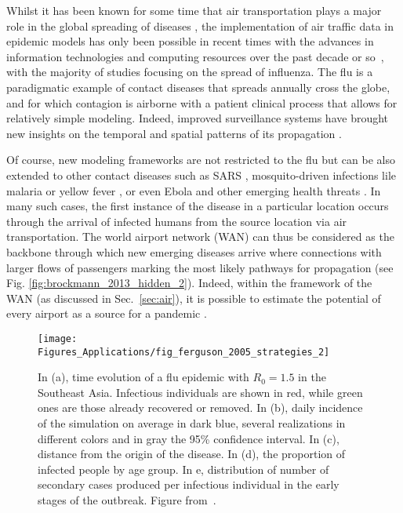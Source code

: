 Whilst it has been known for some time that air transportation plays a major role in the global spreading of diseases \cite{rvachev_1985_mathematical,flahault_1992_method}, the implementation of air traffic data in epidemic models has only been possible in recent times with the advances in information technologies and computing resources over the past decade or so~\cite{hufnagel_2004_forecast,grais_2003_assessing,colizza_2006_role},
%
with the majority of studies focusing on the spread of influenza. The flu is a paradigmatic example of contact diseases that spreads annually cross the globe, and for which contagion is airborne with a patient clinical process that allows for relatively simple modeling. Indeed, improved surveillance systems have brought new insights on the temporal and spatial patterns of its propagation \cite{viboud_2006_synchrony,tizzoni_2012_real}. 

Of course, new modeling frameworks are not restricted to the flu but can be also extended to other contact diseases such as SARS \cite{bauch_2005_dynamically}, mosquito-driven infections lile malaria \cite{huang_2013_global} or yellow fever \cite{johansson_2012_crowd}, or even Ebola and other emerging health threats \cite{jones_2008_global,gomes_2014_assessing}. In many such cases, the first instance of the disease in a particular location occurs through the arrival of infected humans from the source location via air transportation. The world airport network (WAN) can thus be considered as the backbone through which new emerging diseases arrive where connections with larger flows of passengers marking the most likely pathways for propagation \cite{brockmann_2013_hidden} (see Fig. \ref{fig:brockmann_2013_hidden_2}). Indeed, within the framework of the WAN (as discussed in Sec.~\ref{sec:air}), it is possible to estimate the potential of every airport as a source for a pandemic \cite{lawyer_2016_measuring}. 

\begin{figure}[t!]
\centering
\texttt{[image: Figures\_Applications/fig\_ferguson\_2005\_strategies\_2]}
\caption{In (a), time evolution of a flu epidemic with $R_0 = 1.5$ in the Southeast Asia. Infectious individuals are shown in red, while green ones are those already recovered or removed. In (b), daily incidence of the simulation on average in dark blue, several realizations in different colors and in gray the 95\% confidence interval. In (c), distance from the origin of the disease. In (d), the proportion of infected people by age group. In e, distribution of number of secondary cases produced per infectious individual in the early stages of the outbreak. Figure from~\cite{ferguson_2005_strategies}. }
\label{fig:ferguson_2005_strategies_2}
\end{figure}

